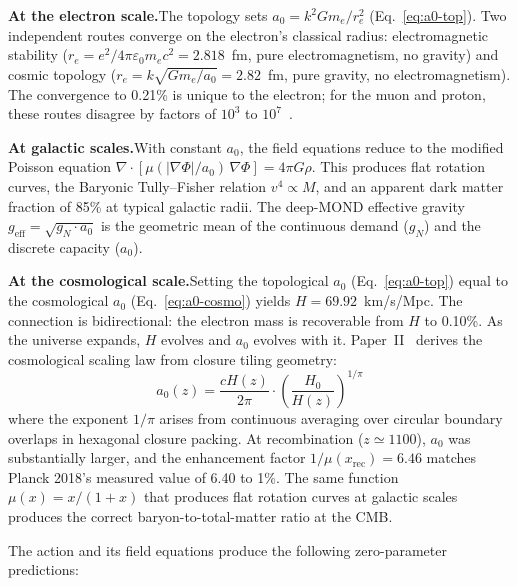 \documentclass[11pt]{article}
\begin{document}
\textbf{At the electron scale.}\quad The topology sets $a_0 = k^2 G m_e / r_e^2$ (Eq.~\ref{eq:a0-top}). Two independent routes converge on the electron's classical radius: electromagnetic stability ($r_e = e^2/4\pi\varepsilon_0 m_e c^2 = 2.818$~fm, pure electromagnetism, no gravity) and cosmic topology ($r_e = k\sqrt{Gm_e/a_0} = 2.82$~fm, pure gravity, no electromagnetism). The convergence to 0.21\% is unique to the electron; for the muon and proton, these routes disagree by factors of $10^3$ to $10^7$~\cite{nelson2026main}.

\textbf{At galactic scales.}\quad With constant $a_0$, the field equations reduce to the modified Poisson equation $\nabla \cdot [\mu(|\nabla\Phi|/a_0)\,\nabla\Phi] = 4\pi G\rho$. This produces flat rotation curves, the Baryonic Tully--Fisher relation $v^4 \propto M$, and an apparent dark matter fraction of 85\% at typical galactic radii. The deep-MOND effective gravity $g_{\text{eff}} = \sqrt{g_N \cdot a_0}$ is the geometric mean of the continuous demand ($g_N$) and the discrete capacity ($a_0$).

\textbf{At the cosmological scale.}\quad Setting the topological $a_0$ (Eq.~\ref{eq:a0-top}) equal to the cosmological $a_0$ (Eq.~\ref{eq:a0-cosmo}) yields $H = 69.92$~km/s/Mpc. The connection is bidirectional: the electron mass is recoverable from $H$ to 0.10\%. As the universe expands, $H$ evolves and $a_0$ evolves with it. Paper~II~\cite{paper2} derives the cosmological scaling law from closure tiling geometry:
\begin{equation}
a_0(z) = \frac{cH(z)}{2\pi} \cdot \left(\frac{H_0}{H(z)}\right)^{1/\pi}
\label{eq:a0z}
\end{equation}
where the exponent $1/\pi$ arises from continuous averaging over circular boundary overlaps in hexagonal closure packing. At recombination ($z \simeq 1100$), $a_0$ was substantially larger, and the enhancement factor $1/\mu(x_{\text{rec}}) = 6.46$ matches Planck 2018's measured value of 6.40 to 1\%. The same function $\mu(x) = x/(1+x)$ that produces flat rotation curves at galactic scales produces the correct baryon-to-total-matter ratio at the CMB.

\vspace{0.5em}
\noindent
The action and its field equations produce the following zero-parameter predictions:
\end{document}
